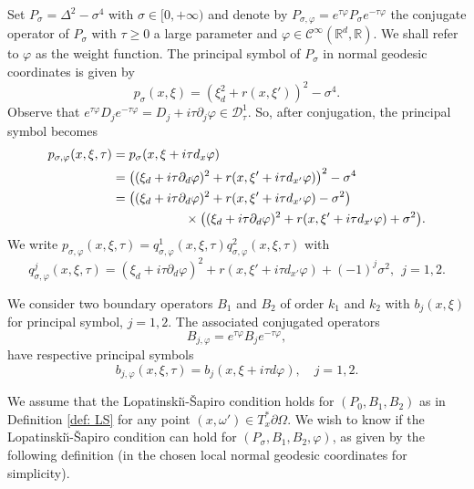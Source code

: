 \documentclass[JEP,XML,SOM,Unicode,published]{cedram}
\theoremstyle{plain}
\theoremstyle{definition}
\def\R{\mathbb{R}}
\newcommand{\LS}{Lopatinski\u{\i}-\v{S}apiro\xspace}
\newcommand{\Dsc}{\mathscr{D}_{\tau}}
\newcommand{\Psig}{P_{\sigma}}
\newcommand{\psig}{p_{\sigma}}
\newcommand{\Pconj}{P_{\sigma,\varphi}}
\newcommand{\pconj}{p_{\sigma,\varphi}}
\newcommand{\qconj}{q_{\sigma,\varphi}}
\newcommand{\Con}{\ensuremath{\mathscr C}}
\newcommand{\Cinf}{\ensuremath{\Con^\infty}}
\begin{document}
Set $\Psig=\Delta^2-\sigma^4$ with $\sigma\in[0,+\infty) $ and denote by $\Pconj=e^{\tau\varphi}\Psig e^{-\tau\varphi}$ the conjugate operator of $\Psig$ with $\tau\geq 0$ a large parameter and $\varphi\in\Cinf(\R^d, \R)$. We shall refer to $\varphi$ as the weight function. The principal symbol of $\Psig$ in normal geodesic coordinates is given by
\[
\psig(x,\xi)=(\xi_d^2+r(x,\xi'))^2-\sigma^4.
\]
Observe that $e^{\tau\varphi}D_je^{-\tau\varphi}=D_j+
i\tau\partial_j\varphi\in\Dsc^1$. So, after conjugation, the principal symbol becomes
\begin{align*}
\pconj(x,\xi,\tau) &= \psig(x,\xi + i \tau d_x \varphi)\\
&=\left((\xi_d+i\tau\partial_d\varphi)^2
+r(x,\xi'+i\tau d_{x'}\varphi)\right)^2
-\sigma^4\\
&= \left((\xi_d+i\tau\partial_d\varphi)^2
+r(x,\xi'+i\tau d_{x'}\varphi)-\sigma^2\right)\\
&\hspace*{2cm}\times \bigl((\xi_d+i\tau\partial_d\varphi)^2+r(x,\xi'+i\tau d_{x'}\varphi)+\sigma^2\bigr).
\end{align*}
We write
$\pconj(x,\xi,\tau)=\qconj^1(x,\xi,\tau)\qconj^2(x,\xi,\tau)$
with
\begin{equation*}
\qconj^j(x,\xi,\tau)
=(\xi_d+i\tau\partial_d\varphi)^2+r(x,\xi'+i\tau
d_{x'}\varphi)+(-1)^j\sigma^2,
\ \
j=1,2.
\end{equation*}

We consider two boundary operators
$B_1$ and $B_2$ of order $k_1$ and $k_2$ with $b_j(x,\xi)$ for
principal symbol, $j=1,2$. The associated conjugated operators
\begin{equation*}
B_{j,\varphi} = e^{\tau \varphi} B_j e^{-\tau \varphi},
\end{equation*}
have respective principal symbols
\begin{equation*}
b_{j,\varphi} (x,\xi, \tau) = b_j(x,\xi+i\tau d\varphi),\quad j=1,2.
\end{equation*}

We assume that the \LS condition holds for $(P_0, B_1, B_2)$ as in
Definition \ref{def: LS} for any point $(x,\omega')\in
T^*_x\partial\Omega$. We wish to know if the \LS condition can hold
for $(\Psig , B_1, B_2,\varphi)$, as given by the following
definition (in the chosen local normal geodesic coordinates for simplicity).
\end{document}
